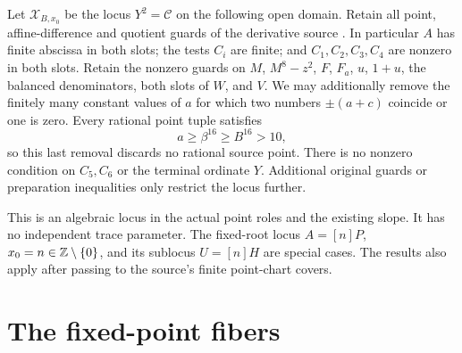 \documentclass[11pt,a4paper]{article}
\begin{document}
Let $\mathcal X_{B,x_0}$ be the locus $Y^2=\mathcal C$ on the
following open domain. Retain all point, affine-difference and quotient
guards of the derivative source \cite{Derivative,Criterion}. In
particular $A$ has finite abscissa in both slots; the tests $C_i$ are
finite; and $C_1,C_2,C_3,C_4$ are nonzero in both slots. Retain
the nonzero guards on $M$, $M^8-z^2$, $F$, $F_a$, $u$, $1+u$,
the balanced denominators, both slots of $W$, and $V$.
We may additionally remove the finitely many constant values of $a$
for which two numbers $\pm(a+c)$ coincide or one is zero.
Every rational point tuple satisfies
\begin{equation}\label{eq:large-a}
                    a\ge\beta^{16}\ge B^{16}>10,
\end{equation}
so this last removal discards no rational source point. There is no
nonzero condition on $C_5,C_6$ or the terminal ordinate $Y$.
Additional original guards or preparation inequalities only restrict
the locus further.

This is an algebraic locus in the actual point roles and the existing
slope. It has no independent trace parameter. The fixed-root locus
$A=[n]P$, $x_0=n\in\mathbb Z\setminus\{0\}$, and its sublocus
$U=[n]H$ are special cases. The results also apply after passing to
the source's finite point-chart covers.

\section{The fixed-point fibers}
\end{document}
